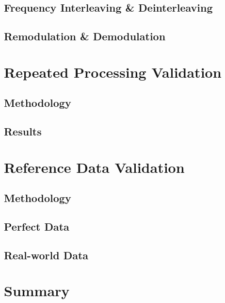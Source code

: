 \documentclass[class=report,11pt,crop=false]{standalone}
\begin{document}
\subsection{Frequency Interleaving \& Deinterleaving}

\subsection{Remodulation \& Demodulation}

\section{Repeated Processing Validation}
\subsection{Methodology}
\subsection{Results}

\section{Reference Data Validation}
\subsection{Methodology}
\subsection{Perfect Data}
\subsection{Real-world Data}

\section{Summary}

\ifstandalone

\printnoidxglossary[type=\acronymtype,nonumberlist]
\fi
\end{document}
